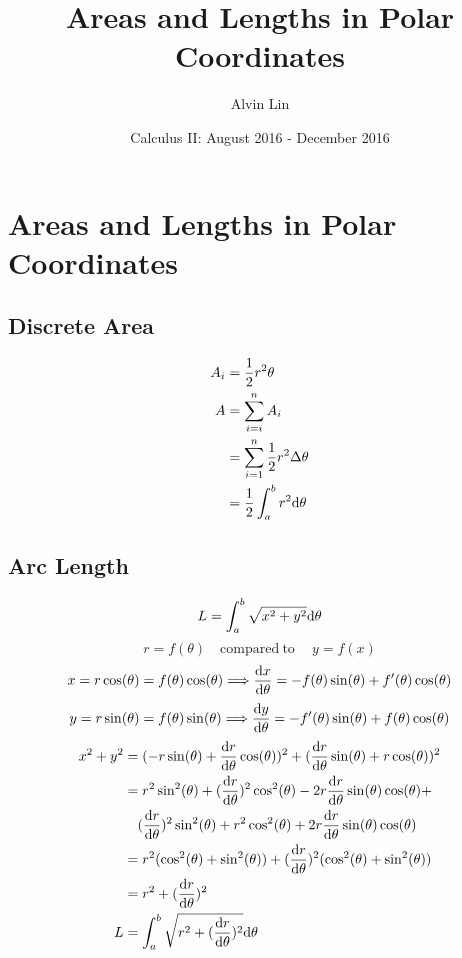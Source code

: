 \documentclass{math}
\title{Areas and Lengths in Polar Coordinates}
\author{Alvin Lin}
\date{Calculus II: August 2016 - December 2016}
\begin{document}
\maketitle

\section*{Areas and Lengths in Polar Coordinates}

\subsection*{Discrete Area}
\begin{center}
\end{center}
\begin{align*}
  A_{i} &= \frac{1}{2}r^{2}\theta \\
  A &= \sum_{i=i}^{n}{A_{i}} \\
  &= \sum_{i=1}^{n}{\frac{1}{2}r^{2}\Delta\theta} \\
  &= \frac{1}{2}\int_{a}^{b}{r^{2}\mathrm{d}{\theta}}
\end{align*}

\subsection*{Arc Length}
\[ L = \int_{a}^{b}{\sqrt{x^{2}+y^{2}}\mathrm{d}{\theta}} \]
\[ r = f(\theta) \quad \mathrm{compared\ to\ } \quad y=f(x) \]
\[ x = r\cos(\theta) = f(\theta)\cos(\theta) \Longrightarrow
   \frac{\mathrm{d}{x}}{\mathrm{d}{\theta}} = -f(\theta)\sin(\theta)+f'(\theta)\cos(\theta) \]
\[ y = r\sin(\theta) = f(\theta)\sin(\theta) \Longrightarrow
   \frac{\mathrm{d}{y}}{\mathrm{d}{\theta}} = -f'(\theta)\sin(\theta)+f(\theta)\cos(\theta) \]
\begin{align*}
  x^{2}+y^{2} &= (-r\sin(\theta)+\frac{\mathrm{d}{r}}{\mathrm{d}{\theta}}\cos(\theta))^{2}
    +(\frac{\mathrm{d}{r}}{\mathrm{d}{\theta}}\sin(\theta)+r\cos(\theta))^{2} \\
  &= r^{2}\sin^{2}(\theta)+(\frac{\mathrm{d}{r}}{\mathrm{d}{\theta}})^{2}\cos^{2}(\theta)-
    2r\frac{\mathrm{d}{r}}{\mathrm{d}{\theta}}\sin(\theta)\cos(\theta)+ \\
  & \quad (\frac{\mathrm{d}{r}}{\mathrm{d}{\theta}})^{2}\sin^{2}(\theta)+r^{2}\cos^{2}(\theta)+
    2r\frac{\mathrm{d}{r}}{\mathrm{d}{\theta}}\sin(\theta)\cos(\theta) \\
  &= r^{2}(\cos^{2}(\theta)+\sin^{2}(\theta))+
    (\frac{\mathrm{d}{r}}{\mathrm{d}{\theta}})^{2}(\cos^{2}(\theta)+\sin^{2}(\theta)) \\
  &= r^{2}+(\frac{\mathrm{d}{r}}{\mathrm{d}{\theta}})^{2} \\
  L &= \int_{a}^{b}{\sqrt{r^{2}+(\frac{\mathrm{d}{r}}{\mathrm{d}{\theta}})^{2}}\mathrm{d}{\theta}}
\end{align*}
\end{document}
